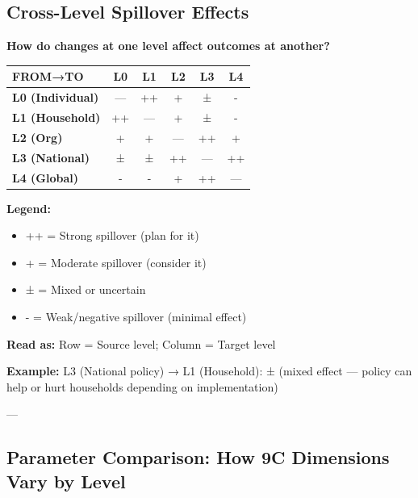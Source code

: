 \subsection*{Cross-Level Spillover Effects}

\textbf{How do changes at one level affect outcomes at another?}

\begin{center}
\small
\begin{tabular}{@{}l|ccccc@{}}
\toprule
\textbf{FROM→TO} & L0 & L1 & L2 & L3 & L4 \\
\midrule
\textbf{L0 (Individual)} & — & ++ & + & ± & - \\
\textbf{L1 (Household)} & ++ & — & + & ± & - \\
\textbf{L2 (Org)} & + & + & — & ++ & + \\
\textbf{L3 (National)} & ± & ± & ++ & — & ++ \\
\textbf{L4 (Global)} & - & - & + & ++ & — \\
\midrule
\end{tabular}
\end{center}

\textbf{Legend:}
\begin{itemize}[nosep]
\item ++ = Strong spillover (plan for it)
\item + = Moderate spillover (consider it)
\item ± = Mixed or uncertain
\item - = Weak/negative spillover (minimal effect)
\end{itemize}

\textbf{Read as:} Row = Source level; Column = Target level

\textbf{Example:} L3 (National policy) → L1 (Household): ± (mixed effect — policy can help or hurt households depending on implementation)

---


\subsection*{Parameter Comparison: How 9C Dimensions Vary by Level}

